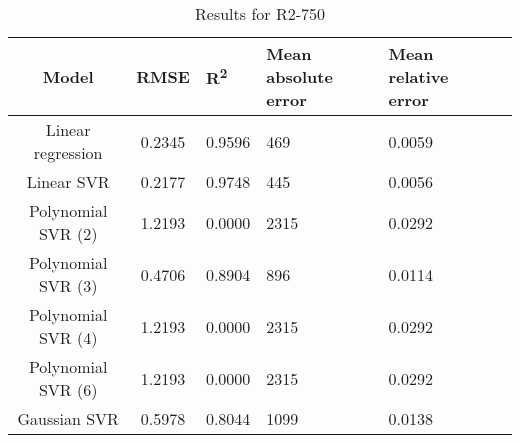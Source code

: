 \begin{table}[H]
\centering
\begin{adjustbox}{center}
\begin{tabular}{c | c M{1.2cm} M{2.5cm} M{2.5cm} M{1.8cm}}
Model & RMSE & R\textsuperscript{2} & Mean absolute error & Mean relative error \tabularnewline
\hline
Linear regression & 0.2345 & 0.9596 &    469 & 0.0059 \\
Linear SVR & 0.2177 & 0.9748 &    445 & 0.0056 \\
Polynomial SVR (2) & 1.2193 & 0.0000 &   2315 & 0.0292 \\
Polynomial SVR (3) & 0.4706 & 0.8904 &    896 & 0.0114 \\
Polynomial SVR (4) & 1.2193 & 0.0000 &   2315 & 0.0292 \\
Polynomial SVR (6) & 1.2193 & 0.0000 &   2315 & 0.0292 \\
Gaussian SVR & 0.5978 & 0.8044 &   1099 & 0.0138 \\
\end{tabular}
\end{adjustbox}
\\
\caption{Results for R2-750}
\label{tab:coreonly_linear_R2_750}
\end{table}
